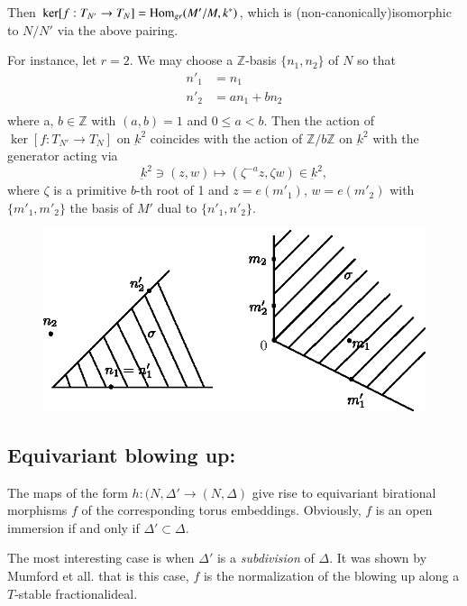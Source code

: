 Then $\ker[f:T_{N'} \to T_N] = \operatorname{Hom}_{gr}(M'/ M, k^*)$, which is
(non-canonically)\pageoriginale isomorphic to $N/N'$ via the above
pairing.   

For instance, let $r=2$. We may choose a $\mathbb{Z}$-basis $\{n_1,
n_2\}$ of $N$ so that  
\begin{align*}
n'_1&=n_1\\
n'_2 &=an_1 +bn_2\\
 \end{align*} 
 where a, $b \in \mathbb{Z}$ with $(a,b)=1$ and $0 \leq a <b$. Then
 the action of $\ker [f:T_{N'} \to T_N]$ on $\underbar{k}^2$ coincides
 with the action  of $\mathbb{Z} /b\mathbb{Z}$ on $\underbar{k}^2$
 with the generator acting via 
 $$
 \underbar{k}^2 \ni (z, w)\longmapsto (\zeta^{-a}z, \zeta w) \in
 \underbar{k}^2, 
 $$
 where $\zeta$ is a primitive $b$-th root of 1 and $z=e(m'_1)$,
 $w=e(m'_2)$ with $\{m'_1, m'_2\}$ the basis of $M'$ dual to $\{n'_1,
 n'_2\}$. 

\begin{figure}[H]
\centering 
\includegraphics{vol58-fig/fig58-7.eps} 
\end{figure}

 \subsection{Equivariant blowing up:}\label{chap1:subsec7.8}
 
 The maps of the form $h: (N, \Delta'\to (N, \Delta)$ give rise to
 equivariant birational morphisms $f$ of the corresponding torus
 embeddings. Obviously, $f$ is an open immersion  if and only if
 $\Delta' \subset \Delta$. 
 
 The most interesting case is when $\Delta'$ is a \textit{ subdivision
 } of $\Delta$. It was shown by Mumford et all. \cite[Thm.10, p.31]{keyTE}
 that is this case, $f$ is the normalization  of the blowing  up along
 a $T$-stable fractional\pageoriginale ideal. 
 
